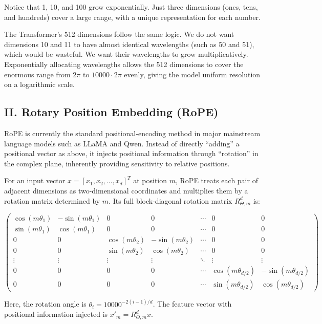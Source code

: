 Notice that 1, 10, and 100 grow exponentially. Just three dimensions (ones, tens, and hundreds) cover a large range, with a unique representation for each number.

The Transformer's 512 dimensions follow the same logic. We do not want dimensions 10 and 11 to have almost identical wavelengths (such as 50 and 51), which would be wasteful. We want their wavelengths to grow multiplicatively. Exponentially allocating wavelengths allows the 512 dimensions to cover the enormous range from \(2\pi\) to \(10000\cdot2\pi\) evenly, giving the model uniform resolution on a logarithmic scale.

\hypertarget{ii.-rotary-position-embedding-rope}{%
\subsection{II. Rotary Position Embedding (RoPE)}\label{ii.-rotary-position-embedding-rope}}

RoPE is currently the standard positional-encoding method in major mainstream language models such as LLaMA and Qwen. Instead of directly ``adding'' a positional vector as above, it injects positional information through ``rotation'' in the complex plane, inherently providing sensitivity to relative positions.

For an input vector \(x=[x_1,x_2,\ldots,x_d]^T\) at position \(m\), RoPE treats each pair of adjacent dimensions as two-dimensional coordinates and multiplies them by a rotation matrix determined by \(m\). Its full block-diagonal rotation matrix \(R_{\Theta,m}^{d}\) is:

\[
\begin{pmatrix}
\cos(m\theta_1) & -\sin(m\theta_1) & 0 & 0 & \cdots & 0 & 0 \\
\sin(m\theta_1) & \cos(m\theta_1) & 0 & 0 & \cdots & 0 & 0 \\
0 & 0 & \cos(m\theta_2) & -\sin(m\theta_2) & \cdots & 0 & 0 \\
0 & 0 & \sin(m\theta_2) & \cos(m\theta_2) & \cdots & 0 & 0 \\
\vdots & \vdots & \vdots & \vdots & \ddots & \vdots & \vdots \\
0 & 0 & 0 & 0 & \cdots & \cos(m\theta_{d/2}) & -\sin(m\theta_{d/2}) \\
0 & 0 & 0 & 0 & \cdots & \sin(m\theta_{d/2}) & \cos(m\theta_{d/2})
\end{pmatrix}
\]

Here, the rotation angle is \(\theta_i=10000^{-2(i-1)/d}\). The feature vector with positional information injected is \(x'_m=R_{\Theta,m}^{d}x\).

